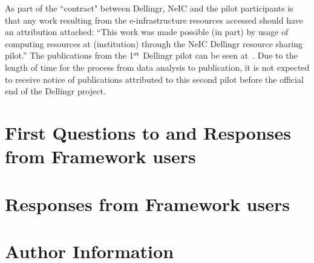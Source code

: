 \documentclass{article}
\newcommand{\dell}{Dellingr\xspace}
\newcommand{\einfra}{e-infrastructure\xspace}
\begin{document}
As part of the ``contract" between \dell, NeIC and the pilot participants is that any work resulting from the \einfra resources accessed should have an attribution attached: 
``This work was made possible (in part) by usage of computing resources at (institution) through the NeIC Dellingr resource sharing pilot.''
The publications from the 1$^{\rm st}$ \dell pilot can be seen at~\cite{pilot-pubs}.
Due to the length of time for the process from data analysis to publication, it is not expected to receive notice of publications attributed to this second pilot before the official end of the \dell project.

\newpage
{}


\newpage
\begin{appendices}

\section{First Questions to and Responses from Framework users}
\label{app:first-questions}


\newpage
\section{Responses from Framework users}
\label{app:answers}


\newpage
\section{Author Information}
\label{app:authors}


\end{appendices}
\end{document}
